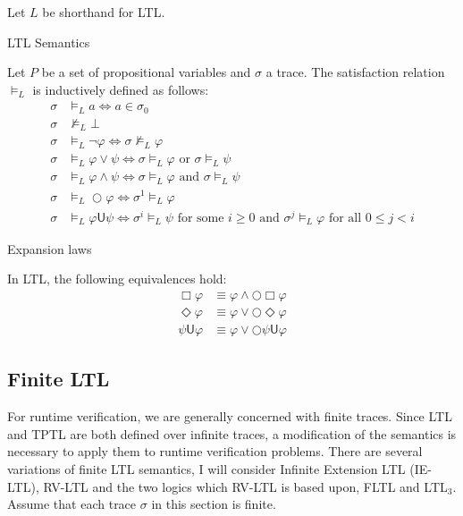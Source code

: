\documentclass[a4paper]{article}
\newcommand{\U}{\mathsf{U}}
\newcommand{\tand}{\text{ and }}
\newcommand{\tor}{\text{ or }}
\newcommand{\fsome}{\text{ for some }}
\newcommand{\fall}{\text{ for all }}
\begin{document}
Let $L$ be shorthand for LTL.

\begin{defn}{LTL Semantics}

  Let $P$ be a set of propositional variables and $\sigma$ a trace. The satisfaction relation $\vDash_{L}$ is inductively defined as follows:
\begin{align*}
  \sigma &\vDash_{L} a \iff a \in \sigma_0\\
  \sigma &\nvDash_{L} \bot\\
  \sigma &\vDash_{L} \neg \varphi \iff \sigma \nvDash_{L} \varphi\\
  \sigma &\vDash_{L} \varphi \lor \psi \iff \sigma \vDash_{L} \varphi \tor \sigma \vDash_{L} \psi\\
  \sigma &\vDash_{L} \varphi \land \psi \iff \sigma \vDash_{L} \varphi \tand \sigma \vDash_{L} \psi\\
  \sigma &\vDash_{L} \bigcirc \varphi \iff \sigma^1 \vDash_{L} \varphi\\
  \sigma &\vDash_{L} \varphi \U \psi \iff \sigma^i \vDash_{L} \psi \fsome i \geq 0 \tand \sigma^j \vDash_{L} \varphi \fall 0 \leq j < i
\end{align*}

\end{defn}

\begin{lem}{Expansion laws}

  In LTL, the following equivalences hold:
  \begin{align}
    \Box \varphi &\equiv \varphi \land \bigcirc \Box \varphi\\
    \Diamond \varphi &\equiv \varphi \lor \bigcirc \Diamond \varphi\\
    \psi \U \varphi &\equiv \varphi \lor \bigcirc \psi \U \varphi
  \end{align}

\end{lem}



\subsection{Finite LTL}
For runtime verification, we are generally concerned with finite traces. Since LTL and TPTL are both defined over infinite traces, a modification of the semantics is necessary to apply them to runtime verification problems. %
There are several variations of finite LTL semantics, I will consider Infinite Extension LTL (IE-LTL)\autocite{rosu2005rewriting}, RV-LTL\autocite{bauer2010comparing} and the two logics which RV-LTL is based upon, FLTL and LTL$_3$\autocite{bauer2010comparing}.
Assume that each trace $\sigma$ in this section is finite.
\end{document}

